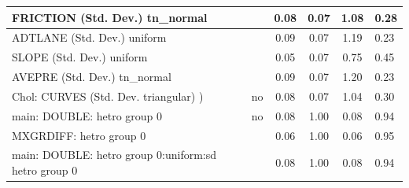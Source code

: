 \begin{table}
\begin{center}
\begin{tabular}{|l|l|c|c|c|l|}
			\hline
			FRICTION (Std. Dev.) tn_normal &  & 0.08 & 0.07 & 1.08 & 0.28 \\
			\hline
			ADTLANE (Std. Dev.) uniform &  & 0.09 & 0.07 & 1.19 & 0.23 \\
			\hline
			SLOPE (Std. Dev.) uniform &  & 0.05 & 0.07 & 0.75 & 0.45 \\
			\hline
			AVEPRE (Std. Dev.) tn_normal &  & 0.09 & 0.07 & 1.20 & 0.23 \\
			\hline
			 Chol: CURVES (Std. Dev. triangular) ) & no & 0.08 & 0.07 & 1.04 & 0.30 \\
			\hline
			main: DOUBLE: hetro group 0 & no & 0.08 & 1.00 & 0.08 & 0.94 \\
			\hline
			MXGRDIFF: hetro group 0 &  & 0.06 & 1.00 & 0.06 & 0.95 \\
			\hline
			main: DOUBLE: hetro group 0:uniform:sd  hetro group 0 &  & 0.08 & 1.00 & 0.08 & 0.94 \\
			\hline
		\end{tabular}
	\end{center}
\end{table}